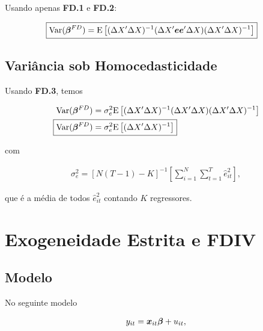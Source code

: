 \documentclass[11pt, oneside, a4paper, article]{article}
\numberwithin{equation}{section}
\begin{document}
\begin{description}
\begin{description}
Usando apenas \textbf{FD.1} e \textbf{FD.2}:

\vspace{-1 em}
\begin{align*} 
\Aboxed{
\Var( \mbs{\beta}^{FD} ) = 
\E \left[
( \Delta X' \Delta X )^{-1}
( \Delta X' \mbs{e}  \mbs{e}' \Delta X )
( \Delta X' \Delta X )^{-1} 
\right]}
\end{align*}

\subsection*{Variância sob Homocedasticidade}

Usando \textbf{FD.3}, temos

\vspace{-1 em}
\begin{align*} 
\Var( \mbs{\beta}^{FD} ) &= 
\sigma_{e}^{2}
\E \left[
( \Delta X' \Delta X )^{-1}
( \Delta X' \Delta X )
( \Delta X' \Delta X )^{-1} 
\right]
\\
\Aboxed{
\Var( \mbs{\beta}^{FD} ) &= 
\sigma^2_{e}
\E \left[
( \Delta X' \Delta X )^{-1} 
\right]}
\end{align*}

\noindent 
com

\vspace{-1 em}
\begin{align*} 
\sigma^2_{e} = 
\left[ N ( T - 1 ) - K \right]^{-1}
\left[  
\sum_{i=1}^{N} 
\sum_{t=1}^{T}
\hat{e}_{it}^{2}
\right],
\end{align*}

\noindent
que é a média de todos $\hat{e}^{2}_{it}$ contando $K$ regressores.

\clearpage
\section{Exogeneidade Estrita e FDIV}


\subsection*{Modelo}

No seguinte modelo

\vspace{-1 em}
\begin{align*} 
	y_{it} = \boldsymbol{x}_{it} \boldsymbol{\beta} + u_{it},
\end{align*}


\end{description}
\end{description}
\end{document}
